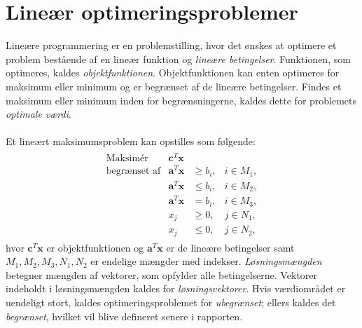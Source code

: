 \chapter{Lineær optimeringsproblemer}
%
Lineære programmering er en problemstilling, hvor det ønskes at optimere et problem bestående af en lineær funktion og \textit{lineære betingelser}.
Funktionen, som optimeres, kaldes \textit{objektfunktionen}.
Objektfunktionen kan enten optimeres for maksimum eller minimum og er begrænset af de lineære betingelser.
Findes et maksimum eller minimum inden for begrænsningerne, kaldes dette for problemets \textit{optimale værdi}.
\\\\
%
Et lineært maksimumsproblem kan opstilles som følgende:
%
\begin{align*}
\begin{array}{lrll}
\text{Maksimér}		&\textbf{c}^T\textbf{x}	&			&\\
\text{begrænset af}	&\textbf{a}^T\textbf{x}	&\geq b_i,	&i \in M_1,\\
					&\textbf{a}^T\textbf{x}	&\leq b_i,	&i \in M_2,\\
					&\textbf{a}^T\textbf{x}	& = b_i,	&i \in M_3,\\
					&x_j					&\geq 0,	&j \in N_1,\\
					&x_j					&\leq 0,	&j \in N_2,
\end{array}
\end{align*}
%
hvor $\textbf{c}^T\textbf{x}$ er objektfunktionen og $\textbf{a}^T\textbf{x}$ er de lineære betingelser samt $M_1, M_2, M_3, N_1, N_2$ er endelige mængder med indekser.
\textit{Løsningsmængden} betegner mængden af vektorer, som opfylder alle betingelserne.
Vektorer indeholdt i løsningsmængden kaldes for \textit{løsningsvektorer}.
Hvis værdiområdet er uendeligt stort, kaldes optimeringsproblemet for \textit{ubegrænset}; ellers kaldes det \textit{begrænset}, hvilket vil blive defineret senere i rapporten. 
\\\\
%
